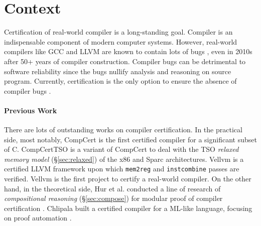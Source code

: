 \documentclass[nocopyrightspace]{sigplanconf}
\begin{document}
\section{Context}
Certification of real-world compiler is a long-standing goal.
Compiler is an indispensable component of modern computer systems.
However, real-world compilers like GCC and LLVM are known to contain
lots of bugs \cite{TODO}, even in 2010s after 50+ years of compiler
construction.  Compiler bugs can be detrimental to software
reliability since the bugs nullify analysis and reasoning on source
program.  Currently, certification is the only option to ensure the
absence of compiler bugs \cite{TODO}.

\paragraph{Previous Work}
There are lots of outstanding works on compiler certification.  In the
practical side, most notably, CompCert \cite{TODO} is the first
certified compiler for a significant subset of C.  CompCertTSO
\cite{TODO} is a variant of CompCert to deal with the TSO
\emph{relaxed memory model} (\S\ref{sec:relaxed}) of the x86 and Sparc
architectures.  Vellvm \cite{TODO} is a certified LLVM framework upon
which \texttt{mem2reg} \cite{TODO} and \texttt{instcombine}
\cite{TODO} passes are verified.  Vellvm is the first project to
certify a real-world compiler.  On the other hand, in the theoretical
side, Hur et al. conducted a line of research of \emph{compositional
  reasoning} (\S\ref{sec:compose}) for modular proof of compiler
certification \cite{TODO}.  Chlipala built a certified compiler for a
ML-like language, focusing on proof automation \cite{TODO}.
\end{document}
